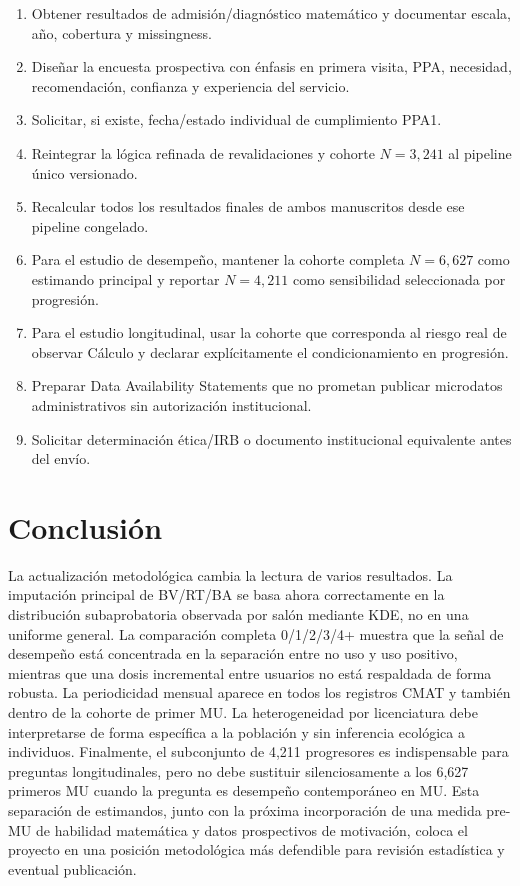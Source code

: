 \documentclass[11pt,letterpaper]{article}
\begin{document}
\begin{enumerate}[leftmargin=*]
\item Obtener resultados de admisión/diagnóstico matemático y documentar escala, año, cobertura y missingness.
\item Diseñar la encuesta prospectiva con énfasis en primera visita, PPA, necesidad, recomendación, confianza y experiencia del servicio.
\item Solicitar, si existe, fecha/estado individual de cumplimiento PPA1.
\item Reintegrar la lógica refinada de revalidaciones y cohorte $N=3,241$ al pipeline único versionado.
\item Recalcular todos los resultados finales de ambos manuscritos desde ese pipeline congelado.
\item Para el estudio de desempeño, mantener la cohorte completa $N=6,627$ como estimando principal y reportar $N=4,211$ como sensibilidad seleccionada por progresión.
\item Para el estudio longitudinal, usar la cohorte que corresponda al riesgo real de observar Cálculo y declarar explícitamente el condicionamiento en progresión.
\item Preparar Data Availability Statements que no prometan publicar microdatos administrativos sin autorización institucional.
\item Solicitar determinación ética/IRB o documento institucional equivalente antes del envío.
\end{enumerate}

\section{Conclusión}

La actualización metodológica cambia la lectura de varios resultados. La imputación principal de BV/RT/BA se basa ahora correctamente en la distribución subaprobatoria observada por salón mediante KDE, no en una uniforme general. La comparación completa 0/1/2/3/4+ muestra que la señal de desempeño está concentrada en la separación entre no uso y uso positivo, mientras que una dosis incremental entre usuarios no está respaldada de forma robusta. La periodicidad mensual aparece en todos los registros CMAT y también dentro de la cohorte de primer MU. La heterogeneidad por licenciatura debe interpretarse de forma específica a la población y sin inferencia ecológica a individuos. Finalmente, el subconjunto de 4,211 progresores es indispensable para preguntas longitudinales, pero no debe sustituir silenciosamente a los 6,627 primeros MU cuando la pregunta es desempeño contemporáneo en MU. Esta separación de estimandos, junto con la próxima incorporación de una medida pre-MU de habilidad matemática y datos prospectivos de motivación, coloca el proyecto en una posición metodológica más defendible para revisión estadística y eventual publicación.
\end{document}
